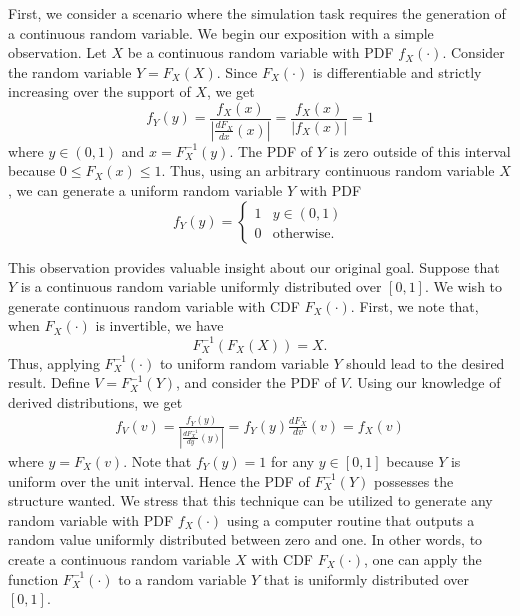 First, we consider a scenario where the simulation task requires the generation of a continuous random variable.
We begin our exposition with a simple observation.
Let $X$ be a continuous random variable with PDF $f_X (\cdot)$.
Consider the random variable $Y = F_X(X)$.
Since $F_X (\cdot)$ is differentiable and strictly increasing over the support of $X$, we get
\begin{equation*}
f_Y (y) = \frac{f_X (x)}{\left| \frac{d F_X}{dx} (x) \right|}
= \frac{f_X (x)}{| f_X (x) |} = 1
\end{equation*}
where $y \in (0, 1)$ and $x = F_X^{-1} (y)$.
The PDF of $Y$ is zero outside of this interval because $0 \leq F_X (x) \leq 1$.
Thus, using an arbitrary continuous random variable $X$, we can generate a uniform random variable $Y$ with PDF
\begin{equation*}
f_Y(y) = \begin{cases} 1 & y \in (0,1) \\
0 & \text{otherwise} . \end{cases}
\end{equation*}

This observation provides valuable insight about our original goal.
Suppose that $Y$ is a continuous random variable uniformly distributed over $[0,1]$.
We wish to generate continuous random variable with CDF $F_X(\cdot)$.
First, we note that, when $F_X (\cdot)$ is invertible, we have
\begin{equation*}
F_X^{-1} \left( F_X (X) \right) = X .
\end{equation*}
Thus, applying $F_X^{-1} (\cdot)$ to uniform random variable $Y$ should lead to the desired result.
Define $V = F_X^{-1} (Y)$, and consider the PDF of $V$.
Using our knowledge of derived distributions, we get
\begin{equation*}
\begin{split}
f_V (v) = \frac{ f_Y (y) }{ \left| \frac{d F_X^{-1}}{dy} (y) \right| }
= f_Y (y) \frac{d F_X}{dv} (v) = f_X (v)
\end{split}
\end{equation*}
where $y = F_X (v)$.
Note that $f_Y (y) = 1$ for any $y \in [0,1]$ because $Y$ is uniform over the unit interval.
Hence the PDF of $F_X^{-1}(Y)$ possesses the structure wanted.
We stress that this technique can be utilized to generate any random variable with PDF $f_X (\cdot)$ using a computer routine that outputs a random value uniformly distributed between zero and one.
In other words, to create a continuous random variable $X$ with CDF $F_X (\cdot)$, one can apply the function $F_X^{-1} (\cdot)$ to a random variable $Y$ that is uniformly distributed over $[0,1]$.

